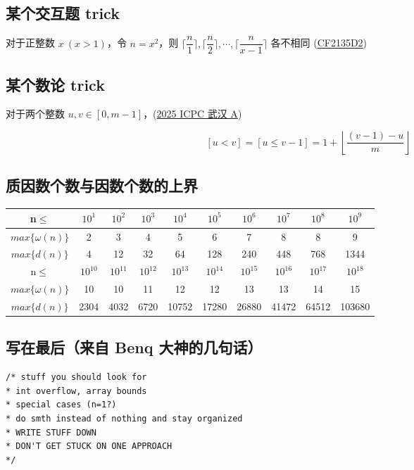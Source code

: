\documentclass[12pt]{article}
\theoremstyle{definition}
\theoremstyle{remark}
\begin{document}
\subsection{某个交互题 trick}

对于正整数 $x\ (x>1)$，令 $n=x^2$，则 $\lceil \dfrac{n}{1}\rceil,\lceil \dfrac{n}{2}\rceil,\cdots,\lceil \dfrac{n}{x-1}\rceil$ 各不相同 (\href{https://codeforces.com/contest/2135/problem/D2}{CF2135D2})

\subsection{某个数论 trick}

对于两个整数 $u, v \in [0, m-1]$，(\href{https://qoj.ac/contest/2609/problem/14719}{2025 ICPC 武汉 A})

$$
[u < v] = [u \leq v-1] = 1 + \left\lfloor \frac{(v-1) - u}{m} \right\rfloor
$$

\subsection{质因数个数与因数个数的上界}

\begin{table}[!ht]
	\centering
	\begin{tabular}{|c|c|c|c|c|c|c|c|c|c|}
		\hline
		n$\le$ & $10^{1}$ & $10^{2}$ & $10^{3}$ & $10^{4}$ & $10^{5}$ & $10^{6}$ & $10^{7}$ & $10^{8}$ & $10^{9}$ \\ \hline
		$max\{\omega(n)\}$ & 2 & 3 & 4 & 5 & 6 & 7 & 8 & 8 & 9 \\ \hline
		$max\{d(n)\}$ & 4 & 12 & 32 & 64 & 128 & 240 & 448 & 768 & 1344 \\ \hline
		n$\le$ & $10^{10}$ & $10^{11}$ & $10^{12}$ & $10^{13}$ & $10^{14}$ & $10^{15}$ & $10^{16}$ & $10^{17}$ & $10^{18}$ \\ \hline
		$max\{\omega(n)\}$ & 10 & 10 & 11 & 12 & 12 & 13 & 13 & 14 & 15 \\ \hline
		$max\{d(n)\}$ & 2304 & 4032 & 6720 & 10752 & 17280 & 26880 & 41472 & 64512 & 103680 \\ \hline
	\end{tabular}
\end{table}

\subsection{写在最后（来自 Benq 大神的几句话）}
 
\begin{lstlisting}[style=C++]
/* stuff you should look for
* int overflow, array bounds
* special cases (n=1?)
* do smth instead of nothing and stay organized
* WRITE STUFF DOWN
* DON'T GET STUCK ON ONE APPROACH
*/
\end{lstlisting}
\end{document}
